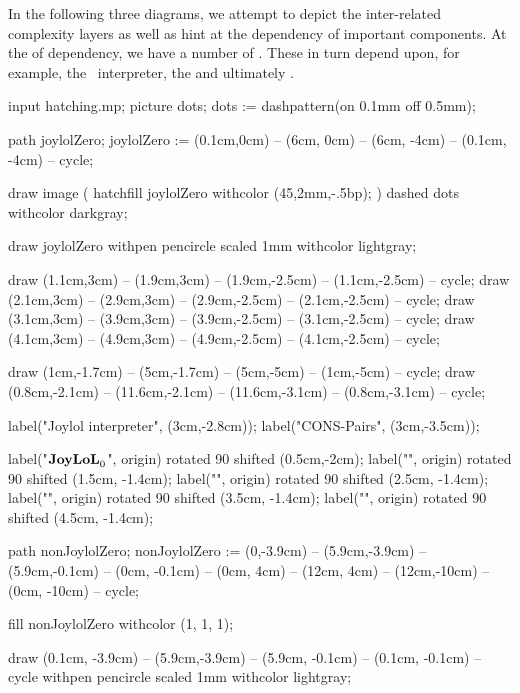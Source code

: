 In the following three diagrams, we attempt to depict the inter-related 
complexity layers as well as hint at the  dependency of 
important components. At the  of  
dependency, we have a number of . These in turn 
depend upon, for example, the \joylol\ interpreter, the  
and ultimately . 

\bgroup\startMPcode
input hatching.mp;
picture dots; dots := dashpattern(on 0.1mm off 0.5mm);

path joylolZero;
joylolZero := (0.1cm,0cm) -- (6cm, 0cm) --
  (6cm, -4cm) -- (0.1cm, -4cm) -- cycle;

draw image (
  hatchfill joylolZero
    withcolor (45,2mm,-.5bp);
) dashed dots withcolor darkgray;

draw joylolZero
  withpen pencircle scaled 1mm
  withcolor lightgray;


draw (1.1cm,3cm) -- (1.9cm,3cm) -- (1.9cm,-2.5cm) -- (1.1cm,-2.5cm) -- cycle;
draw (2.1cm,3cm) -- (2.9cm,3cm) -- (2.9cm,-2.5cm) -- (2.1cm,-2.5cm) -- cycle;
draw (3.1cm,3cm) -- (3.9cm,3cm) -- (3.9cm,-2.5cm) -- (3.1cm,-2.5cm) -- cycle;
draw (4.1cm,3cm) -- (4.9cm,3cm) -- (4.9cm,-2.5cm) -- (4.1cm,-2.5cm) -- cycle;

draw (1cm,-1.7cm) -- (5cm,-1.7cm) -- (5cm,-5cm) -- (1cm,-5cm) -- cycle;
draw (0.8cm,-2.1cm) -- (11.6cm,-2.1cm) -- (11.6cm,-3.1cm) -- (0.8cm,-3.1cm) -- cycle;


label("Joylol interpreter", (3cm,-2.8cm));
label("CONS-Pairs", (3cm,-3.5cm));

label("$\bold{JoyLoL}_0$", origin) rotated 90 shifted (0.5cm,-2cm);
label("", origin) rotated 90 shifted (1.5cm, -1.4cm);
label("", origin) rotated 90 shifted (2.5cm, -1.4cm);
label("", origin) rotated 90 shifted (3.5cm, -1.4cm);
label("", origin) rotated 90 shifted (4.5cm, -1.4cm);

path nonJoylolZero;
nonJoylolZero := (0,-3.9cm) -- (5.9cm,-3.9cm) --
  (5.9cm,-0.1cm) -- (0cm, -0.1cm) -- (0cm, 4cm) -- (12cm, 4cm) --
  (12cm,-10cm) -- (0cm, -10cm) -- cycle;

fill nonJoylolZero withcolor (1, 1, 1);

draw (0.1cm, -3.9cm) -- (5.9cm,-3.9cm) -- (5.9cm, -0.1cm) -- (0.1cm, -0.1cm) -- cycle
  withpen pencircle scaled 1mm
  withcolor lightgray;

